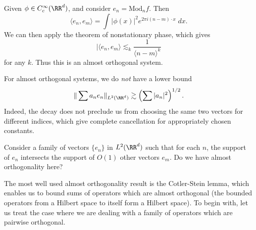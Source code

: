 \begin{example}
  Given $\phi \in C_c^\infty(\RR^d)$, and consider $e_n = \text{Mod}_n f$. Then
  \[ \langle e_n, e_m \rangle = \int |\phi(x)|^2 e^{2 \pi i (n - m) \cdot x}\; dx. \]
  We can then apply the theorem of nonstationary phase, which gives
  \[ |\langle e_n, e_m \rangle \lesssim_k \frac{1}{\langle n - m \rangle^k} \]
  for any $k$. Thus this is an almost orthogonal system.
\end{example}

For almost orthogonal systems, we do \emph{not} have a lower bound
%
\[ \| \sum a_n e_n \|_{L^2(\RR^d)} \gtrsim \left( \sum |a_n|^2 \right)^{1/2}. \]
%
Indeed, the decay does not preclude us from choosing the same two vectors for different indices, which give complete cancellation for appropriately chosen constants.

\begin{example}
  Consider a family of vectors $\{ e_n \}$ in $L^2(\RR^d)$ such that for each $n$, the support of $e_n$ intersects the support of $O(1)$ other vectors $e_m$. Do we have almost orthogonality here?
\end{example}



The most well used almost orthogonality result is the Cotler-Stein lemma, which enables us to bound sums of operators which are almost orthogonal (the bounded operators from a Hilbert space to itself form a Hilbert space). To begin with, let us treat the case where we are dealing with a family of operators which are pairwise orthogonal.

